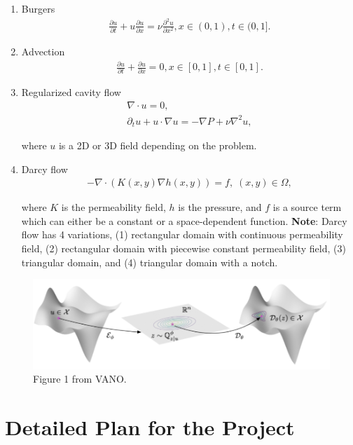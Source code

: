 \documentclass[11pt, fullpage,letterpaper]{article}
\begin{document}
\begin{enumerate}
    \item Burgers
        \begin{align}
            \frac{\partial u}{\partial t} + u \frac{\partial u}{\partial x} = \nu \frac{\partial^2 u}{\partial x^2}, x \in (0, 1), t \in (0, 1].
        \end{align}

    \item Advection
        \begin{align}
            \frac{\partial u}{\partial t} + \frac{\partial u}{\partial x} = 0, x \in [0, 1], t \in [0, 1].
        \end{align}

    \item Regularized cavity flow
        \begin{align}
            \nabla \cdot u = 0, \nonumber \\
            \partial_t u + u \cdot \nabla u = - \nabla P + \nu \nabla^2 u,
        \end{align}

        where $u$ is a 2D or 3D field depending on the problem.

    \item Darcy flow
        \begin{align}
            - \nabla \cdot (K(x, y) \nabla h(x, y)) = f, \; (x, y) \in \Omega,
        \end{align}

        where $K$ is the permeability field, $h$ is the pressure, and $f$ is a source term which can either be a constant or a space-dependent function. \textbf{Note}: Darcy flow has 4 variations, (1) rectangular domain with continuous permeability field, (2) rectangular domain with piecewise constant permeability field, (3) triangular domain, and (4) triangular domain with a notch.
\end{enumerate}

\begin{figure}
    \centering
    \includegraphics[width=0.5\linewidth]{fig.png}
    \caption{Figure 1 from VANO.}
    \label{fig:vano}
\end{figure}


\section{Detailed Plan for the Project}
\end{document}
